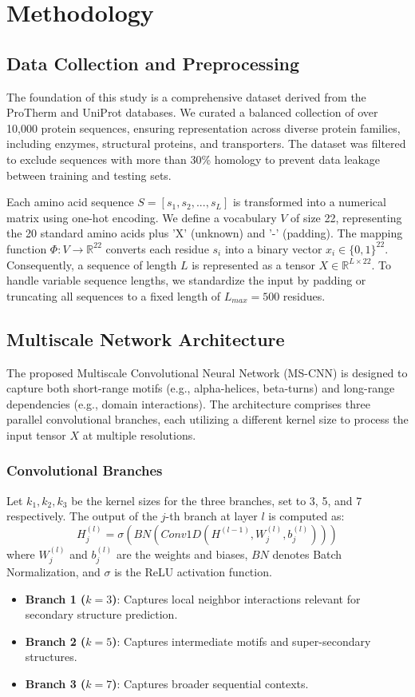 \documentclass[conference]{IEEEtran}
\begin{document}
\section{Methodology}
\subsection{Data Collection and Preprocessing}
The foundation of this study is a comprehensive dataset derived from the ProTherm and UniProt databases. We curated a balanced collection of over 10,000 protein sequences, ensuring representation across diverse protein families, including enzymes, structural proteins, and transporters. The dataset was filtered to exclude sequences with more than 30\% homology to prevent data leakage between training and testing sets.

Each amino acid sequence $S = [s_1, s_2, ..., s_L]$ is transformed into a numerical matrix using one-hot encoding. We define a vocabulary $V$ of size 22, representing the 20 standard amino acids plus 'X' (unknown) and '-' (padding). The mapping function $\Phi: V \to \mathbb{R}^{22}$ converts each residue $s_i$ into a binary vector $x_i \in \{0, 1\}^{22}$. Consequently, a sequence of length $L$ is represented as a tensor $X \in \mathbb{R}^{L \times 22}$. To handle variable sequence lengths, we standardize the input by padding or truncating all sequences to a fixed length of $L_{max} = 500$ residues.

\subsection{Multiscale Network Architecture}
The proposed Multiscale Convolutional Neural Network (MS-CNN) is designed to capture both short-range motifs (e.g., alpha-helices, beta-turns) and long-range dependencies (e.g., domain interactions). The architecture comprises three parallel convolutional branches, each utilizing a different kernel size to process the input tensor $X$ at multiple resolutions.

\subsubsection{Convolutional Branches}
Let $k_1, k_2, k_3$ be the kernel sizes for the three branches, set to 3, 5, and 7 respectively. The output of the $j$-th branch at layer $l$ is computed as:
\begin{equation}
H^{(l)}_j = \sigma(BN(Conv1D(H^{(l-1)}, W_j^{(l)}, b_j^{(l)})))
\end{equation}
where $W_j^{(l)}$ and $b_j^{(l)}$ are the weights and biases, $BN$ denotes Batch Normalization, and $\sigma$ is the ReLU activation function. 
\begin{itemize}
    \item \textbf{Branch 1 ($k=3$)}: Captures local neighbor interactions relevant for secondary structure prediction.
    \item \textbf{Branch 2 ($k=5$)}: Captures intermediate motifs and super-secondary structures.
    \item \textbf{Branch 3 ($k=7$)}: Captures broader sequential contexts.
\end{itemize}
\end{document}
